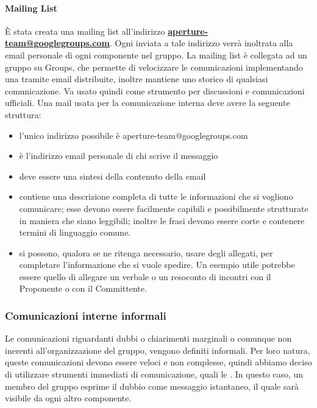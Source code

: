 \paragraph{Mailing List \\}
\label{3.2.2}
È stata creata una mailing list all'indirizzo \textbf{\url{aperture-team@googlegroups.com}}.
Ogni  inviata a tale indirizzo verrà inoltrata alla email personale di ogni componente nel gruppo.
La mailing list è collegata ad un gruppo su  Groups, che permette di velocizzare le comunicazioni implementando una  tramite email distribuite, inoltre mantiene uno storico di qualsiasi comunicazione. Va usato quindi come strumento per discussioni e comunicazioni ufficiali. 
Una mail usata per la comunicazione interna deve avere la seguente struttura:
\begin{itemize}
\item {} l'unico indirizzo possibile è aperture-team@googlegroups.com
\item {} è l'indirizzo email personale di chi scrive il messaggio
\item {} deve essere una sintesi della contenuto della email
\item {} contiene una descrizione completa di tutte le informazioni che si vogliono comunicare; esse devono essere facilmente capibili e possibilmente strutturate in maniera che siano leggibili; inoltre le frasi devono essere corte e contenere termini di linguaggio comune.
\item {} si possono, qualora se ne ritenga necessario, usare degli allegati, per completare l'informazione che si vuole spedire. Un esempio utile potrebbe essere quello di allegare un verbale o un resoconto di incontri con il Proponente  o con il Committente.
\end{itemize}


\subsubsection{Comunicazioni interne informali}
Le comunicazioni riguardanti dubbi o chiarimenti marginali o comunque non inerenti all'organizzazione del gruppo, vengono definiti informali. Per loro natura, queste comunicazioni devono essere veloci e non complesse, quindi abbiamo deciso di utilizzare strumenti immediati di comunicazione, quali le . In questo caso, un membro del gruppo esprime il dubbio come messaggio istantaneo, il quale sarà visibile da ogni altro componente. 

